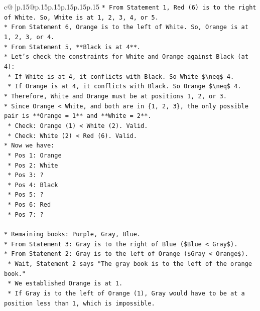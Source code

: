 \documentclass{article}
\begin{document}
{\begin{supertabular}{c@{$\;$}|p{.15\linewidth}@{}p{.15\linewidth}p{.15\linewidth}p{.15\linewidth}p{.15\linewidth}p{.15\linewidth}}
{{{\texttt{*   From Statement 1, Red (6) is to the right of White. So, White is at 1, 2, 3, 4, or 5.} \\
\texttt{*   From Statement 6, Orange is to the left of White. So, Orange is at 1, 2, 3, or 4.} \\
\texttt{*   From Statement 5, **Black is at 4**.} \\
\texttt{*   Let's check the constraints for White and Orange against Black (at 4):} \\
\texttt{    *   If White is at 4, it conflicts with Black. So White \$\textbackslash{}neq\$ 4.} \\
\texttt{    *   If Orange is at 4, it conflicts with Black. So Orange \$\textbackslash{}neq\$ 4.} \\
\texttt{*   Therefore, White and Orange must be at positions 1, 2, or 3.} \\
\texttt{*   Since Orange < White, and both are in \{1, 2, 3\}, the only possible pair is **Orange = 1** and **White = 2**.} \\
\texttt{    *   Check: Orange (1) < White (2). Valid.} \\
\texttt{    *   Check: White (2) < Red (6). Valid.} \\
\texttt{*   Now we have:} \\
\texttt{    *   Pos 1: Orange} \\
\texttt{    *   Pos 2: White} \\
\texttt{    *   Pos 3: ?} \\
\texttt{    *   Pos 4: Black} \\
\texttt{    *   Pos 5: ?} \\
\texttt{    *   Pos 6: Red} \\
\texttt{    *   Pos 7: ?} \\
\\ 
\texttt{*   Remaining books: Purple, Gray, Blue.} \\
\texttt{*   From Statement 3: Gray is to the right of Blue (\$Blue < Gray\$).} \\
\texttt{*   From Statement 2: Gray is to the left of Orange (\$Gray < Orange\$).} \\
\texttt{    *   Wait, Statement 2 says "The gray book is to the left of the orange book."} \\
\texttt{    *   We established Orange is at 1.} \\
\texttt{    *   If Gray is to the left of Orange (1), Gray would have to be at a position less than 1, which is impossible.} \\
}}}
\end{supertabular}}
\end{document}
